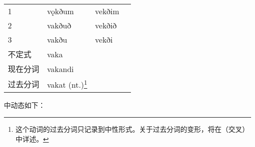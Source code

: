 \begin{longtable}{llll}
  1          & vǫkðum                                                                                             & vekðim &       \\
  2          & vakðuð                                                                                             & vekðið &       \\
  3          & vakðu                                                                                              & vekði  &       \\
  不定式     & vaka                                                                                               &        &       \\
  现在分词   & vakandi                                                                                            &        &       \\
  过去分词   & vakat (nt.)\footnote{这个动词的过去分词只记录到中性形式。关于过去分词的变形，将在（交叉）中详述。}
             &                                                                                                    &                \\
\end{longtable}

中动态如下：

